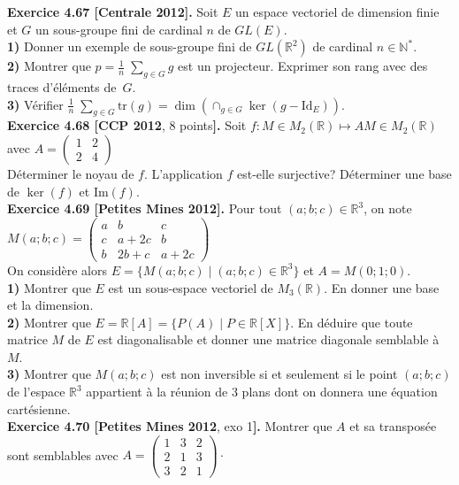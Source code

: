 \documentclass[a4paper,12pt,francais]{article}
\newcommand{\field}[1]{\mathbb{#1}}
\newcommand{\N}{\field{N}}
\newcommand{\R}{\field{R}}
\newcommand{\id}{\mbox{Id}}
\newcommand{\im}{\mbox{Im}}
\newcommand{\tr}{\mbox{tr}}
\begin{document}
\noindent
{\bf Exercice 4.67 [Centrale 2012].} Soit $E$ un espace vectoriel de dimension finie et $G$ un sous-groupe fini de cardinal $n$ de $GL(E)$.\\
{\bf 1)} Donner un exemple de sous-groupe fini de $GL(\R^2)$ de cardinal $n\in \N^*$.\\
{\bf 2)}  Montrer que $\displaystyle p=\frac{1}{n}\; \sum_{g \in G} g$  est un projecteur. Exprimer son rang avec des traces d'éléments de~$G$.\\
{\bf 3)} Vérifier $\displaystyle \frac{1}{n} \; \sum_{g \in G} \tr(g)= \dim \left({ \cap_{g\in G} \ker(g-\id_E)}\right)$.\\

\noindent
{\bf Exercice 4.68 [CCP 2012}, 8 points{\bf].} Soit $f : M \in M_2(\R)\mapsto AM \in M_2(\R)$ avec $A=\left({\begin{array}{cc}
1&2\\
2&4
\end{array} }\right)$\\
Déterminer le noyau de $f$. L'application $f$ est-elle surjective? Déterminer une base de $\ker(f)$ et $\im(f)$.\\

\noindent
{\bf Exercice 4.69 [Petites Mines 2012].} Pour tout $(a;b;c)\in \R^3$, on note 
$\displaystyle
M(a;b;c)=\left({\begin{array}{ccc}
a&b&c\\
c&a+2c&b\\
b&2b+c&a+2c
\end{array}}\right)$\\
On considère alors $E=\{M(a;b;c)\; |\; (a;b;c)\in \R^3\}$ et $A=M(0;1;0)$.\\
{\bf 1)} Montrer que $E$ est un sous-espace vectoriel de $M_3(\R)$. En donner une base et la dimension.\\
{\bf 2)} Montrer que $E=\R[A]=\{P(A)\; |\; P \in \R[X]\}$. En déduire que toute matrice $M$ de $E$ est diagonalisable et donner une matrice diagonale semblable à $M$.\\
{\bf 3)} Montrer que $M(a;b;c)$ est non inversible si et seulement si le point $(a;b;c)$ de l'espace $\R^3$ appartient à la réunion de 3 plans dont on donnera une équation cartésienne.\\

\noindent
{\bf Exercice 4.70 [Petites Mines 2012}, exo 1{\bf].} Montrer que $A$ et sa transposée sont semblables avec $A= \left({\begin{array}{ccc}
1&3&2\\
2&1&3\\
3&2&1
\end{array}}\right)\cdot$\\
\end{document}
